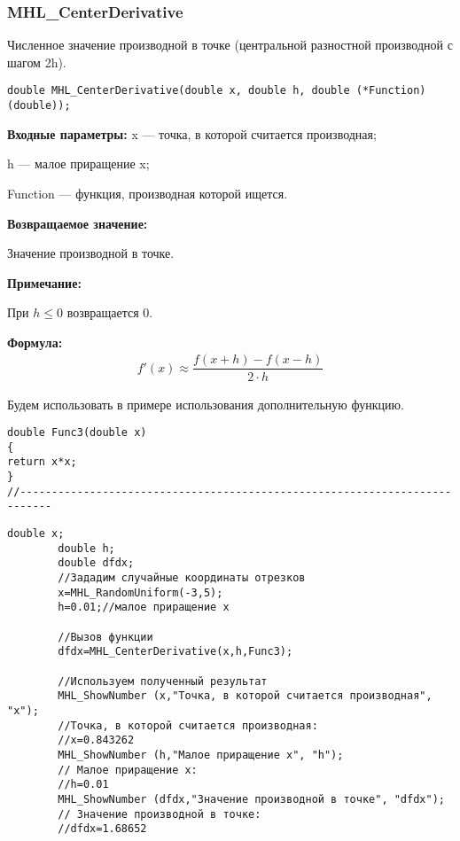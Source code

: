 \documentclass[a4paper,12pt]{article}
\begin{document}
\subsubsection{MHL\_CenterDerivative}\label{MHL_CenterDerivative}

Численное значение производной в точке (центральной разностной производной с шагом 2h).


\begin{lstlisting}[label=code_syntax_MHL_CenterDerivative,caption=Синтаксис]
double MHL_CenterDerivative(double x, double h, double (*Function)(double));
\end{lstlisting}

\textbf{Входные параметры:}
 x --- точка, в которой считается производная;
 
 h --- малое приращение x;
 
 Function --- функция, производная которой ищется.

\textbf{Возвращаемое значение:}
 
 Значение производной в точке.
 
 \textbf{Примечание:}
 
 При $h\leq0$ возвращается $0$.

\textbf{Формула:}
\begin{eqnarray*}
f'\left( x\right) \approx \dfrac{f\left( x+h\right)-f\left( x-h\right) }{2\cdot h}
\end{eqnarray*}

Будем использовать в примере использования дополнительную функцию.

\begin{lstlisting}[caption=Дополнительная функция]
double Func3(double x)
{
return x*x;
}
//---------------------------------------------------------------------------
\end{lstlisting}


\begin{lstlisting}[label=code_use_MHL_CenterDerivative,caption=Пример использования]
        double x;
        double h;
        double dfdx;
        //Зададим случайные координаты отрезков
        x=MHL_RandomUniform(-3,5);
        h=0.01;//малое приращение x

        //Вызов функции
        dfdx=MHL_CenterDerivative(x,h,Func3);

        //Используем полученный результат
        MHL_ShowNumber (x,"Точка, в которой считается производная", "x");
        //Точка, в которой считается производная:
        //x=0.843262
        MHL_ShowNumber (h,"Малое приращение x", "h");
        // Малое приращение x:
        //h=0.01
        MHL_ShowNumber (dfdx,"Значение производной в точке", "dfdx");
        // Значение производной в точке:
        //dfdx=1.68652
\end{lstlisting}
\end{document}
